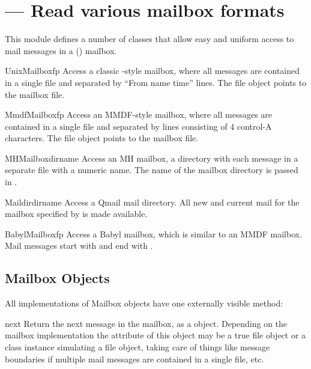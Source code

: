 \section{ ---
         Read various mailbox formats}



This module defines a number of classes that allow easy and uniform
access to mail messages in a (\UNIX{}) mailbox.

\begin{classdesc}{UnixMailbox}{fp}
Access a classic \UNIX{}-style mailbox, where all messages are contained
in a single file and separated by ``From name time'' lines.
The file object  points to the mailbox file.
\end{classdesc}

\begin{classdesc}{MmdfMailbox}{fp}
Access an MMDF-style mailbox, where all messages are contained
in a single file and separated by lines consisting of 4 control-A
characters.  The file object  points to the mailbox file.
\end{classdesc}

\begin{classdesc}{MHMailbox}{dirname}
Access an MH mailbox, a directory with each message in a separate
file with a numeric name.
The name of the mailbox directory is passed in .
\end{classdesc}

\begin{classdesc}{Maildir}{dirname}
Access a Qmail mail directory.  All new and current mail for the
mailbox specified by  is made available.
\end{classdesc}

\begin{classdesc}{BabylMailbox}{fp}
Access a Babyl mailbox, which is similar to an MMDF mailbox.  Mail
messages start with  and end with
.
\end{classdesc}


\subsection{Mailbox Objects \label{mailbox-objects}}

All implementations of Mailbox objects have one externally visible
method:

\begin{methoddesc}[mailbox]{next}{}
Return the next message in the mailbox, as a  object.
Depending on the mailbox implementation the  attribute of this
object may be a true file object or a class instance simulating a file object,
taking care of things like message boundaries if multiple mail messages are
contained in a single file, etc.
\end{methoddesc}
